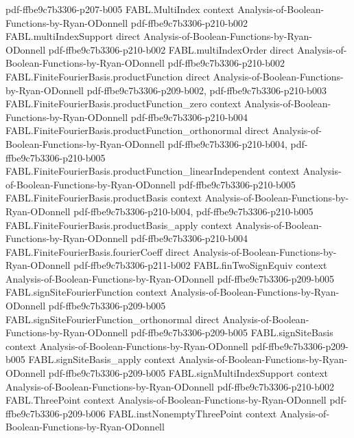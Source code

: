 \begin{theorem}
  {pdf-ffbe9c7b3306-p207-b005}
\proofstep
  {FABL.MultiIndex}
  {context}
  {Analysis-of-Boolean-Functions-by-Ryan-ODonnell}
  {pdf-ffbe9c7b3306-p210-b002}
\proofstep
  {FABL.multiIndexSupport}
  {direct}
  {Analysis-of-Boolean-Functions-by-Ryan-ODonnell}
  {pdf-ffbe9c7b3306-p210-b002}
\proofstep
  {FABL.multiIndexOrder}
  {direct}
  {Analysis-of-Boolean-Functions-by-Ryan-ODonnell}
  {pdf-ffbe9c7b3306-p210-b002}
\proofstep
  {FABL.FiniteFourierBasis.productFunction}
  {direct}
  {Analysis-of-Boolean-Functions-by-Ryan-ODonnell}
  {pdf-ffbe9c7b3306-p209-b002,
    pdf-ffbe9c7b3306-p210-b003}
\proofstep
  {FABL.FiniteFourierBasis.productFunction_zero}
  {context}
  {Analysis-of-Boolean-Functions-by-Ryan-ODonnell}
  {pdf-ffbe9c7b3306-p210-b004}
\proofstep
  {FABL.FiniteFourierBasis.productFunction_orthonormal}
  {direct}
  {Analysis-of-Boolean-Functions-by-Ryan-ODonnell}
  {pdf-ffbe9c7b3306-p210-b004,
    pdf-ffbe9c7b3306-p210-b005}
\proofstep
  {FABL.FiniteFourierBasis.productFunction_linearIndependent}
  {context}
  {Analysis-of-Boolean-Functions-by-Ryan-ODonnell}
  {pdf-ffbe9c7b3306-p210-b005}
\proofstep
  {FABL.FiniteFourierBasis.productBasis}
  {context}
  {Analysis-of-Boolean-Functions-by-Ryan-ODonnell}
  {pdf-ffbe9c7b3306-p210-b004,
    pdf-ffbe9c7b3306-p210-b005}
\proofstep
  {FABL.FiniteFourierBasis.productBasis_apply}
  {context}
  {Analysis-of-Boolean-Functions-by-Ryan-ODonnell}
  {pdf-ffbe9c7b3306-p210-b004}
\proofstep
  {FABL.FiniteFourierBasis.fourierCoeff}
  {direct}
  {Analysis-of-Boolean-Functions-by-Ryan-ODonnell}
  {pdf-ffbe9c7b3306-p211-b002}
\proofstep
  {FABL.finTwoSignEquiv}
  {context}
  {Analysis-of-Boolean-Functions-by-Ryan-ODonnell}
  {pdf-ffbe9c7b3306-p209-b005}
\proofstep
  {FABL.signSiteFourierFunction}
  {context}
  {Analysis-of-Boolean-Functions-by-Ryan-ODonnell}
  {pdf-ffbe9c7b3306-p209-b005}
\proofstep
  {FABL.signSiteFourierFunction_orthonormal}
  {direct}
  {Analysis-of-Boolean-Functions-by-Ryan-ODonnell}
  {pdf-ffbe9c7b3306-p209-b005}
\proofstep
  {FABL.signSiteBasis}
  {context}
  {Analysis-of-Boolean-Functions-by-Ryan-ODonnell}
  {pdf-ffbe9c7b3306-p209-b005}
\proofstep
  {FABL.signSiteBasis_apply}
  {context}
  {Analysis-of-Boolean-Functions-by-Ryan-ODonnell}
  {pdf-ffbe9c7b3306-p209-b005}
\proofstep
  {FABL.signMultiIndexSupport}
  {context}
  {Analysis-of-Boolean-Functions-by-Ryan-ODonnell}
  {pdf-ffbe9c7b3306-p210-b002}
\proofstep
  {FABL.ThreePoint}
  {context}
  {Analysis-of-Boolean-Functions-by-Ryan-ODonnell}
  {pdf-ffbe9c7b3306-p209-b006}
\proofstep
  {FABL.instNonemptyThreePoint}
  {context}
  {Analysis-of-Boolean-Functions-by-Ryan-ODonnell}

\end{theorem}
